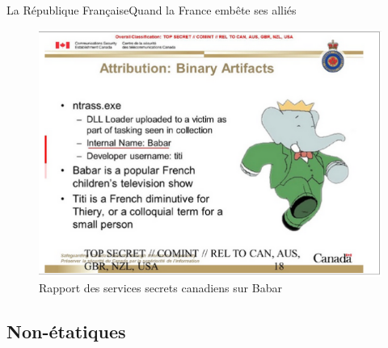 \documentclass{beamer}
\begin{document}
\begin{frame}{La République Française}{Quand la France embête ses alliés}
    
    \begin{figure}[h]
        \includegraphics[scale=0.35]{BabarVirus}
        \caption{\label{SlideBabar} Rapport des services secrets canadiens sur Babar} 
    \end{figure}

\end{frame}

\subsection{Non-étatiques}
\end{document}
